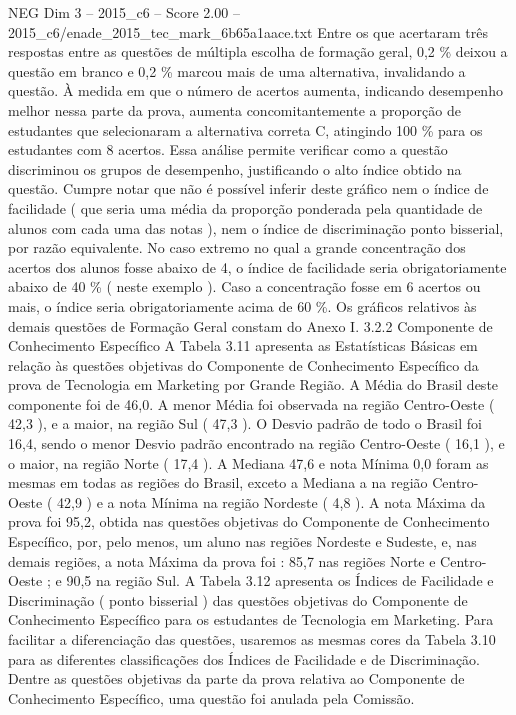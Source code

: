 \begin{textsample}{NEG Dim 3 – 2015\_c6 – Score 2.00 – 2015\_c6/enade\_2015\_tec\_mark\_6b65a1aace.txt}
Entre os que acertaram três respostas entre as questões de múltipla escolha de formação geral, 0,2 \% deixou a questão em branco e 0,2 \% marcou mais de uma alternativa, invalidando a questão.
À medida em que o número de acertos aumenta, indicando desempenho melhor nessa parte da prova, aumenta concomitantemente a proporção de estudantes que selecionaram a alternativa correta C, atingindo 100 \% para os estudantes com 8 acertos.
Essa análise permite verificar como a questão discriminou os grupos de desempenho, justificando o alto índice obtido na questão.
Cumpre notar que não é possível inferir deste gráfico nem o índice de facilidade ( que seria uma média da proporção ponderada pela quantidade de alunos com cada uma das notas ), nem o índice de discriminação ponto bisserial, por razão equivalente.
No caso extremo no qual a grande concentração dos acertos dos alunos fosse abaixo de 4, o índice de facilidade seria obrigatoriamente abaixo de 40 \% ( neste exemplo ).
Caso a concentração fosse em 6 acertos ou mais, o índice seria obrigatoriamente acima de 60 \%.
Os gráficos relativos às demais questões de Formação Geral constam do Anexo I. 3.2.2 Componente de Conhecimento Específico A Tabela 3.11 apresenta as Estatísticas Básicas em relação às questões objetivas do Componente de Conhecimento Específico da prova de Tecnologia em Marketing por Grande Região.
A Média do Brasil deste componente foi de 46,0.
A menor Média foi observada na região Centro-Oeste ( 42,3 ), e a maior, na região Sul ( 47,3 ).
O Desvio padrão de todo o Brasil foi 16,4, sendo o menor Desvio padrão encontrado na região Centro-Oeste ( 16,1 ), e o maior, na região Norte ( 17,4 ).
A Mediana 47,6 e nota Mínima 0,0 foram as mesmas em todas as regiões do Brasil, exceto a Mediana a na região Centro-Oeste ( 42,9 ) e a nota Mínima na região Nordeste ( 4,8 ).
A nota Máxima da prova foi 95,2, obtida nas questões objetivas do Componente de Conhecimento Específico, por, pelo menos, um aluno nas regiões Nordeste e Sudeste, e, nas demais regiões, a nota Máxima da prova foi : 85,7 nas regiões Norte e Centro-Oeste ; e 90,5 na região Sul.
A Tabela 3.12 apresenta os Índices de Facilidade e Discriminação ( ponto bisserial ) das questões objetivas do Componente de Conhecimento Específico para os estudantes de Tecnologia em Marketing.
Para facilitar a diferenciação das questões, usaremos as mesmas cores da Tabela 3.10 para as diferentes classificações dos Índices de Facilidade e de Discriminação.
Dentre as questões objetivas da parte da prova relativa ao Componente de Conhecimento Específico, uma questão foi anulada pela Comissão.

\end{textsample}
